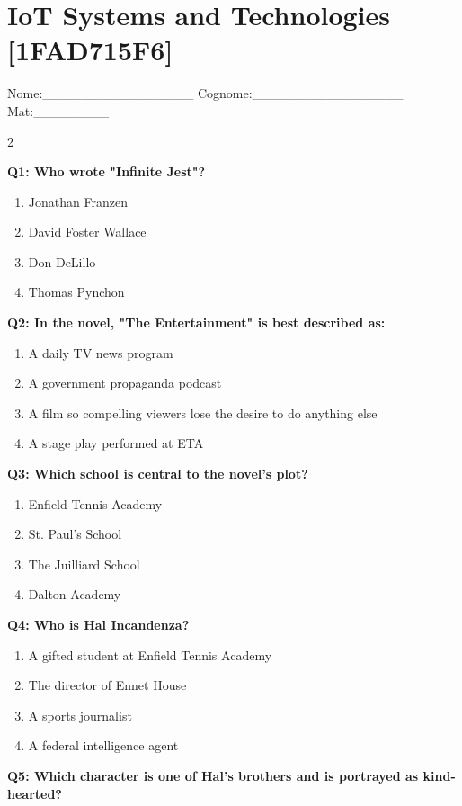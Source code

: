 \documentclass[10pt]{article}
\begin{document}
\section*{IoT Systems and Technologies \footnotesize [1FAD715F6]}
{\footnotesize Nome:\_\_\_\_\_\_\_\_\_\_\_\_\_\_\_\_ Cognome:\_\_\_\_\_\_\_\_\_\_\_\_\_\_\_\_ Mat:\_\_\_\_\_\_\_\_}
\begin{multicols}{2}

\textbf{Q1: Who wrote "Infinite Jest"?}

\begin{enumerate}[label=\arabic*.]
\item Jonathan Franzen
\item David Foster Wallace
\item Don DeLillo
\item Thomas Pynchon
\end{enumerate}
\textbf{Q2: In the novel, "The Entertainment" is best described as:}

\begin{enumerate}[label=\arabic*.]
\item A daily TV news program
\item A government propaganda podcast
\item A film so compelling viewers lose the desire to do anything else
\item A stage play performed at ETA
\end{enumerate}
\textbf{Q3: Which school is central to the novel's plot?}

\begin{enumerate}[label=\arabic*.]
\item Enfield Tennis Academy
\item St. Paul's School
\item The Juilliard School
\item Dalton Academy
\end{enumerate}
\textbf{Q4: Who is Hal Incandenza?}

\begin{enumerate}[label=\arabic*.]
\item A gifted student at Enfield Tennis Academy
\item The director of Ennet House
\item A sports journalist
\item A federal intelligence agent
\end{enumerate}
\textbf{Q5: Which character is one of Hal's brothers and is portrayed as kind-hearted?}


\end{multicols}
\end{document}
